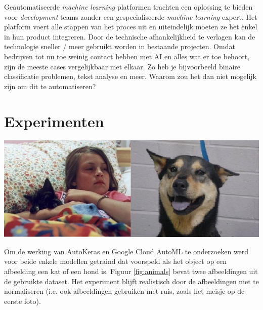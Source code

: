 \documentclass[a0,portrait]{a0poster}
\begin{document}
\begin{multicols}{2}
Geautomatiseerde \textit{machine learning} platformen trachten een oplossing te bieden voor \textit{development} teams zonder een gespecialiseerde \textit{machine learning} expert. Het platform voert alle stappen van het proces uit en uiteindelijk moeten ze het enkel in hun product integreren. Door de technische afhankelijkheid te verlagen kan de technologie sneller / meer gebruikt worden in bestaande projecten. Omdat bedrijven tot nu toe weinig contact hebben met AI en alles wat er toe behoort, zijn de meeste cases vergelijkbaar met elkaar. Zo heb je bijvoorbeeld binaire classificatie problemen, tekst analyse en meer. Waarom zou het dan niet mogelijk zijn om dit te automatiseren? 


\color{Black} %
\color{HoGentAccent1} 
\section*{Experimenten}
\color{black}


\begin{center}\vspace{1cm}
    \includegraphics[width=1\linewidth]{./figures/animal.jpg}
    \label{fig:animals}    
\end{center}

Om de werking van AutoKeras en Google Cloud AutoML te onderzoeken werd voor beide enkele modellen getraind dat voorspeld als het object op een afbeelding een kat of een hond is. Figuur \ref{fig:animals} bevat twee afbeeldingen uit de gebruikte dataset. Het experiment blijft realistisch door de afbeeldingen niet te normaliseren (i.e. ook afbeeldingen gebruiken met ruis, zoals het meisje op de eerste foto).


\end{multicols}
\end{document}
